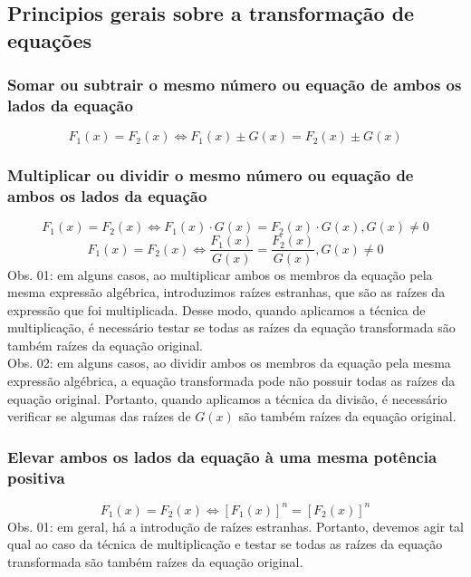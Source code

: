 \documentclass{article}
\begin{document}
\subsection{Principios gerais sobre a transformação de equações}

\subsubsection{Somar ou subtrair o mesmo número ou equação de ambos os lados da equação}
\begin{equation*}
    F_1(x)=F_2(x)\Leftrightarrow F_1(x)\pm G(x)=F_2(x)\pm G(x)
\end{equation*}

\subsubsection{Multiplicar ou dividir o mesmo número ou equação de ambos os lados da equação}
\begin{equation*}
    F_1(x)=F_2(x)\Leftrightarrow F_1(x)\cdot G(x)=F_2(x)\cdot G(x), G(x)\neq 0
\end{equation*}
\begin{equation*}
    F_1(x)=F_2(x)\Leftrightarrow \frac{F_1(x)}{G(x)}=\frac{F_2(x)}{G(x)}, G(x)\neq 0
\end{equation*}
\indent Obs. 01: em alguns casos, ao multiplicar ambos os membros da equação pela mesma expressão algébrica, introduzimos raízes estranhas, que são as raízes da expressão que foi multiplicada. Desse modo, quando aplicamos a técnica de multiplicação, é necessário testar se todas as raízes da equação transformada são também raízes da equação original.\\
\indent Obs. 02: em alguns casos, ao dividir ambos os membros da equação pela mesma expressão algébrica, a equação transformada pode não possuir todas as raízes da equação original. Portanto, quando aplicamos a técnica da divisão, é necessário verificar se algumas das raízes de $G(x)$ são também raízes da equação original.

\subsubsection{Elevar ambos os lados da equação à uma mesma potência positiva}
\begin{equation*}
    F_1(x)=F_2(x)\Leftrightarrow [F_1(x)]^n=[F_2(x)]^n
\end{equation*}
\indent Obs. 01: em geral, há a introdução de raízes estranhas. Portanto, devemos agir tal qual ao caso da técnica de multiplicação e testar se todas as raízes da equação transformada são também raízes da equação original.
\end{document}

